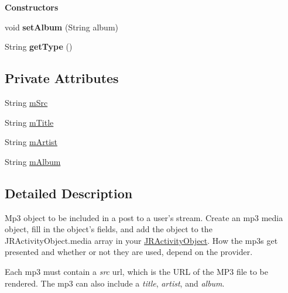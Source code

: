 \begin{Indent}{\bf Constructors}
\begin{DoxyCompactItemize}
\item 
\hypertarget{classcom_1_1janrain_1_1android_1_1engage_1_1types_1_1_j_r_mp3_media_object_a90033ebe6c28a946a4c88965365961fb}{
void {\bfseries setAlbum} (String album)}
\label{classcom_1_1janrain_1_1android_1_1engage_1_1types_1_1_j_r_mp3_media_object_a90033ebe6c28a946a4c88965365961fb}

\item 
\hypertarget{classcom_1_1janrain_1_1android_1_1engage_1_1types_1_1_j_r_mp3_media_object_a68adac94351807681f1b2828b9c68734}{
String {\bfseries getType} ()}
\label{classcom_1_1janrain_1_1android_1_1engage_1_1types_1_1_j_r_mp3_media_object_a68adac94351807681f1b2828b9c68734}

\end{DoxyCompactItemize}
\end{Indent}
\subsection*{Private Attributes}
\begin{DoxyCompactItemize}
\item 
String \hyperlink{classcom_1_1janrain_1_1android_1_1engage_1_1types_1_1_j_r_mp3_media_object_a55bae62e4521511e834270cbb7910aa6}{mSrc}
\item 
String \hyperlink{classcom_1_1janrain_1_1android_1_1engage_1_1types_1_1_j_r_mp3_media_object_a6a07e9575c466f0cfeb02907ae8d0973}{mTitle}
\item 
String \hyperlink{classcom_1_1janrain_1_1android_1_1engage_1_1types_1_1_j_r_mp3_media_object_a447e5238acd3b656ad1658af4d1d585b}{mArtist}
\item 
String \hyperlink{classcom_1_1janrain_1_1android_1_1engage_1_1types_1_1_j_r_mp3_media_object_a0beebc1720c6f4bcf3190b3a112658b4}{mAlbum}
\end{DoxyCompactItemize}


\subsection{Detailed Description}
Mp3 object to be included in a post to a user's stream. Create an mp3 media object, fill in the object's fields, and add the object to the JRActivityObject.media array in your \hyperlink{classcom_1_1janrain_1_1android_1_1engage_1_1types_1_1_j_r_activity_object}{JRActivityObject}. How the mp3s get presented and whether or not they are used, depend on the provider.

Each mp3 must contain a {\itshape src\/} url, which is the URL of the MP3 file to be rendered. The mp3 can also include a {\itshape title\/}, {\itshape artist\/}, and {\itshape album\/}.

